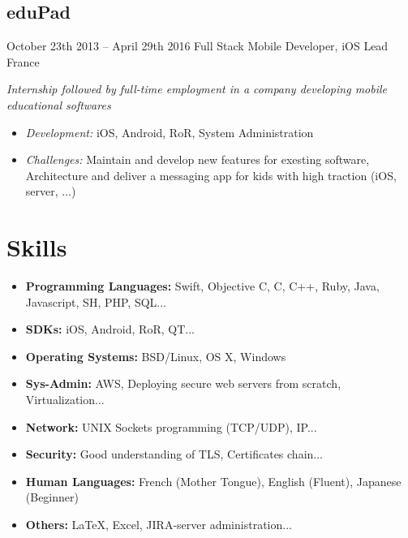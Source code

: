 \documentclass[]{template/friggeri-cv} %
\begin{document}
\subsection{eduPad}
\begin{entrylist}


\entry
{October 23th 2013 -- April 29th 2016}
{Full Stack Mobile Developer, iOS Lead}
{France}
{\emph{Internship followed by full-time employment in a company developing mobile educational softwares}
\begin{itemize}
\item{\emph{Development:} iOS, Android, RoR, System Administration}
\item{\emph{Challenges:} Maintain and develop new features for exesting software, Architecture and deliver a messaging app for kids with high traction (iOS, server, ...)}

\end{itemize}
}

\end{entrylist}





\section{Skills}

\begin{itemize}
\item \textbf{Programming Languages:} Swift, Objective C, C, C++, Ruby, Java, Javascript, SH, PHP, SQL...
\item \textbf{SDKs:} iOS, Android, RoR, QT...
\item \textbf{Operating Systems:} BSD/Linux, OS X, Windows
\item \textbf{Sys-Admin:} AWS, Deploying secure web servers from scratch, Virtualization...
\item \textbf{Network:} UNIX Sockets programming (TCP/UDP), IP...
\item \textbf{Security:} Good understanding of TLS, Certificates chain...
\item \textbf{Human Languages:} French (Mother Tongue), English (Fluent), Japanese (Beginner)
\item \textbf{Others:} \LaTeX, Excel, JIRA-server administration...
\end{itemize}
\end{document}
